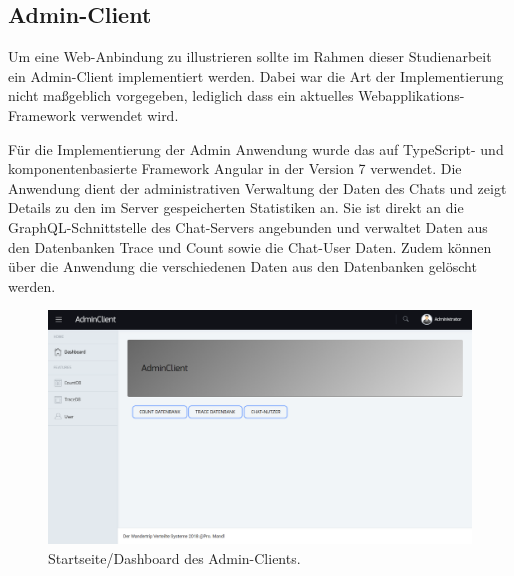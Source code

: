 \documentclass[10pt,journal,compsoc]{IEEEtran}
\begin{document}
\subsection{Admin-Client}
\label{sub:admin}

Um eine Web-Anbindung zu illustrieren sollte im Rahmen dieser Studienarbeit ein Admin-Client implementiert werden. Dabei war die Art der Implementierung nicht maßgeblich vorgegeben, lediglich dass ein aktuelles Webapplikations-Framework verwendet wird.  

Für die Implementierung der Admin Anwendung wurde das auf TypeScript- und komponentenbasierte Framework Angular in der Version 7 verwendet. Die Anwendung dient der administrativen Verwaltung der Daten des Chats und zeigt Details zu den im Server gespeicherten Statistiken an. Sie ist direkt an die GraphQL-Schnittstelle des Chat-Servers angebunden und verwaltet Daten aus den Datenbanken Trace und Count sowie die Chat-User Daten. Zudem können über die Anwendung die verschiedenen Daten aus den Datenbanken gelöscht werden.

\begin{figure}[h]
	\centering
	\includegraphics[scale=0.25]{Bilder/AdminClient_Dashboard.PNG}
	\caption{Startseite/Dashboard des Admin-Clients.}
	\label{fig:adminClientStartseite}
\end{figure}
\end{document}
